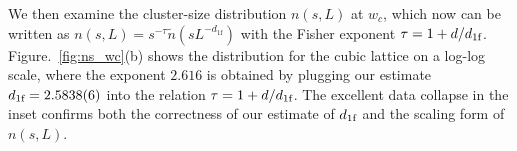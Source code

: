 

We then examine the cluster-size distribution $n(s, L)$ at $w_c$, which now can be written as $n(s, L) = s^{-\tau} \tilde{n}(s L^{-d_{1\textrm{f}}})$ with
the Fisher exponent $\tau = 1 + d/{d_{1\textrm{f}}}$. Figure.~\ref{fig:ns_wc}(b) shows the distribution for the cubic lattice on a log-log scale, where the exponent $2.616$ is obtained by plugging our estimate ${d_{1\textrm{f}}}=2.5838(6)$
into the relation $\tau = 1+d/{d_{1\textrm{f}}}$. The excellent data collapse in the inset confirms both the correctness of our estimate of ${d_{1\textrm{f}}}$ and the scaling form of $n(s, L)$.

